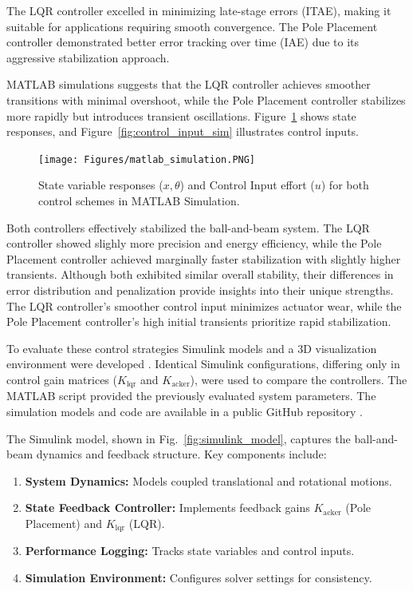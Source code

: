 \documentclass[conference]{IEEEtran}
\begin{document}
The LQR controller excelled in minimizing late-stage errors (ITAE), making it suitable for applications requiring smooth convergence. The Pole Placement controller demonstrated better error tracking over time (IAE) due to its aggressive stabilization approach.

MATLAB simulations suggests that the LQR controller achieves smoother transitions with minimal overshoot, while the Pole Placement controller stabilizes more rapidly but introduces transient oscillations. Figure~\ref{fig:state_sim} shows state responses, and Figure~\ref{fig:control_input_sim} illustrates control inputs.

\begin{figure}[H]
    \centering
    \texttt{[image: Figures/matlab\_simulation.PNG]}
    \caption{State variable responses (\(x, \theta\)) and Control Input effort (\(u\)) for both control schemes in MATLAB Simulation.}
    \label{fig:state_sim}
\end{figure}

Both controllers effectively stabilized the ball-and-beam system. The LQR controller showed slighly more precision and energy efficiency, while the Pole Placement controller achieved marginally faster stabilization with slightly higher transients. Although both exhibited similar overall stability, their differences in error distribution and penalization provide insights into their unique strengths. The LQR controller's smoother control input minimizes actuator wear, while the Pole Placement controller’s high initial transients prioritize rapid stabilization.

To evaluate these control strategies Simulink models and a 3D visualization environment were developed \cite{ball_beam_simulink}. Identical Simulink configurations, differing only in control gain matrices (\(K_{\text{lqr}}\) and \(K_{\text{acker}}\)), were used to compare the controllers. The MATLAB script provided the previously evaluated system parameters. The simulation models and code are available in a public GitHub repository \cite{github_repo}.

The Simulink model, shown in Fig.~\ref{fig:simulink_model}, captures the ball-and-beam dynamics and feedback structure. Key components include:
\begin{enumerate}
    \item \textbf{System Dynamics:} Models coupled translational and rotational motions.
    \item \textbf{State Feedback Controller:} Implements feedback gains \(K_{\text{acker}}\) (Pole Placement) and \(K_{\text{lqr}}\) (LQR).
    \item \textbf{Performance Logging:} Tracks state variables and control inputs.
    \item \textbf{Simulation Environment:} Configures solver settings for consistency.
\end{enumerate}
\end{document}
